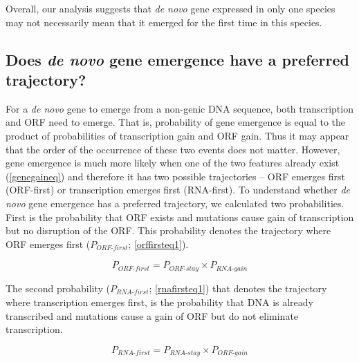 \documentclass[12pt,a4paper]{article}
\begin{document}
Overall, our analysis suggests that \textit{de novo} gene expressed in only one species may not necessarily mean that it emerged for the first time in this species. 

\subsection{Does \textit{de novo} gene emergence have a preferred trajectory?}

For a \textit{de novo} gene to emerge from a non-genic DNA sequence, both transcription and ORF need to emerge. That is, probability of gene emergence is equal to the product of probabilities of transcription gain and ORF gain. Thus it may appear that the order of the occurrence of these two events does not matter. However, gene emergence is much more likely when one of the two features already exist (\autoref{genegaineq}) and therefore it has two possible trajectories -- ORF emerges first (ORF-first) or transcription emerges first (RNA-first). To understand whether \textit{de novo} gene emergence has a preferred trajectory, we calculated two probabilities. First is the probability that ORF exists and  mutations cause gain of transcription but no disruption of the ORF. This probability denotes the trajectory where ORF emerges first ($P_\textit{ORF-first}$; \autoref{orffirsteq1}). 

\begin{equation}
P_\textit{ORF-first} = P_\textit{ORF-stay}\times P_\textit{RNA-gain}
\label{orffirsteq1}
\end{equation}

The second probability ($P_\textit{RNA-first}$; \autoref{rnafirsteq1}) that denotes the trajectory where transcription emerges first, is the probability that DNA is already transcribed and mutations cause a gain of ORF but do not eliminate transcription. 

\begin{equation}
P_\textit{RNA-first} = P_\textit{RNA-stay}\times P_\textit{ORF-gain}
\label{rnafirsteq1}
\end{equation}
\end{document}
